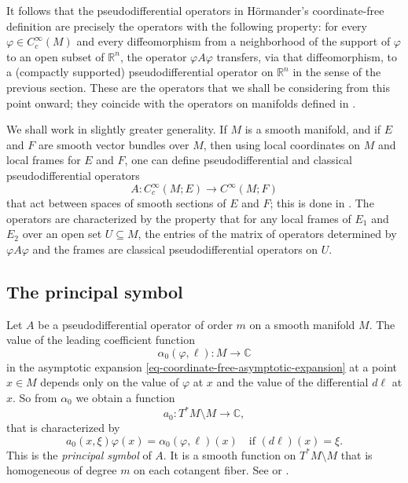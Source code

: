 \documentclass[leqno,11pt]{amsart}
\numberwithin{equation}{subsection}
\theoremstyle{plain}
\theoremstyle{definition}
\theoremstyle{remark}
\newcommand{\R}{\mathbb{R}}
\newcommand{\C}{\mathbb{C}}
\begin{document}
It follows that the pseudodifferential operators in H\"ormander's coord\-inate-free definition are precisely the operators with the following property: for every $\varphi  \in C^\infty _c(M)$ and every diffeomorphism from a neighborhood of the support of $\varphi $ to an open subset of $\R^n$, the operator $\varphi  A \varphi $ transfers, via that diffeomorphism, to a (compactly supported) pseudodifferential operator on $\R^n$ in the sense of the previous section.  These are the operators that we shall be considering from this point onward; they coincide with the operators on manifolds  defined in \cite[Def.\ 18.1.20]{HormanderVolIII}.



We shall work in  slightly greater generality.  If $M$ is a smooth manifold,  and if $E$ and $F$ are smooth vector bundles over $M$, then using local coordinates on $M$ and local frames for $E$ and $F$, one can define pseudodifferential and classical pseudodifferential operators
\begin{equation}
    \label{eq-psdo-on-sections-of-bundles}
A \colon C_c^\infty (M;E)\longrightarrow C^\infty (M;F)
\end{equation}
that act between spaces of smooth sections of $E$ and $F$; this is done in   \cite[Def.~18.1.32]{HormanderVolIII}.  The operators  are characterized by the property that for any local frames of $E_1$ and $E_2$ over an open set $U\subseteq M$,   the entries of the matrix of operators determined  by $\varphi A \varphi $ and   the frames are classical pseudodifferential operators on $U$.

\subsection{The principal symbol}

Let $A$ be a pseudodifferential operator of order $m$ on a smooth manifold $M$. The value of the leading coefficient function 
\[
\alpha_0(\varphi ,\ell)\colon M \longrightarrow \C
\] 
in the asymptotic expansion \eqref{eq-coordinate-free-asymptotic-expansion} at a point $x\in M$ depends only on the value of  $\varphi  $ at $x$  and the value  of the differential $d\ell$ at $x$.  So from $\alpha_0$ we obtain a function 
\[
a_0 \colon T^*M\setminus M  \longrightarrow \C ,
\]
that is characterized by 
\[
a_0(x,\xi)\varphi (x) = \alpha_0(\varphi ,\ell)(x)\quad\text{if \ $(d\ell)(x) = \xi $.}
\]
This is the \emph{principal symbol} of $A$. It is a smooth  function on $T^*M\setminus M$ that is  homogeneous of degree $m$ on each cotangent fiber. 
 See \cite[Lemmas 2.2 \& 2.3]{Hormander65} or \cite[pp.~82-83]{HormanderVolIII}.  
 
\end{document}
